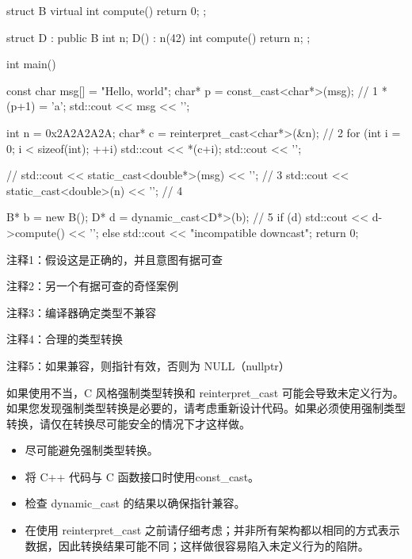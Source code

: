 \begin{cpp}
struct B {
  virtual int compute() { return 0; }
};

struct D : public B {
  int n;
  D() : n(42) {}
  int compute() { return n; }
};

int main() {
  const char msg[] = "Hello, world";
  char* p = const_cast<char*>(msg); // 1
  *(p+1) = 'a';
  std::cout << msg << '\n';

  int n = 0x2A2A2A2A;
  char* c = reinterpret_cast<char*>(&n); // 2
  for (int i = 0; i < sizeof(int); ++i)
    std::cout << *(c+i);
  std::cout << '\n';

  // std::cout << static_cast<double*>(msg) << '\n'; // 3
  std::cout << static_cast<double>(n) << '\n'; // 4

  B* b = new B();
  D* d = dynamic_cast<D*>(b); // 5
  if (d)
    std::cout << d->compute() << '\n';
  else
    std::cout << "incompatible downcast\n";
  return 0;
}
\end{cpp}

{\footnotesize
注释1：假设这是正确的，并且意图有据可查

注释2：另一个有据可查的奇怪案例

注释3：编译器确定类型不兼容

注释4：合理的类型转换

注释5：如果兼容，则指针有效，否则为 NULL（nullptr）
}

如果使用不当，C 风格强制类型转换和 reinterpret\_cast 可能会导致未定义行为。如果您发现强制类型转换是必要的，请考虑重新设计代码。如果必须使用强制类型转换，请仅在转换尽可能安全的情况下才这样做。


\begin{itemize}
\item
尽可能避免强制类型转换。

\item
将 C++ 代码与 C 函数接口时使用const\_cast。

\item
检查 dynamic\_cast 的结果以确保指针兼容。

\item
在使用 reinterpret\_cast 之前请仔细考虑；并非所有架构都以相同的方式表示数据，因此转换结果可能不同；这样做很容易陷入未定义行为的陷阱。
\end{itemize}





